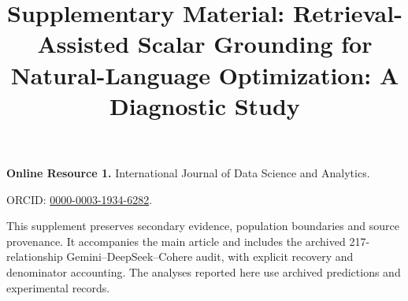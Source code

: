 \documentclass[pdflatex,sn-basic,Numbered]{sn-jnl}
\begin{document}
\title[Supplement: Scalar Grounding]{Supplementary Material: Retrieval-Assisted Scalar Grounding for Natural-Language Optimization: A Diagnostic Study}
\author*[1]{ }
\maketitle
\renewcommand{\thesection}{S\arabic{section}}
\renewcommand{\thetable}{S\arabic{table}}
\renewcommand{\thefigure}{S\arabic{figure}}
\renewcommand{\theequation}{S\arabic{equation}}
\noindent\textbf{Online Resource 1.} International Journal of Data Science and Analytics.\par
\noindent ORCID: \href{https://orcid.org/0000-0003-1934-6282}{0000-0003-1934-6282}.\par

This supplement preserves secondary evidence, population boundaries and source provenance. It accompanies the main article and includes the archived 217-relationship Gemini--DeepSeek--Cohere audit, with explicit recovery and denominator accounting. The analyses reported here use archived predictions and experimental records.
\end{document}
